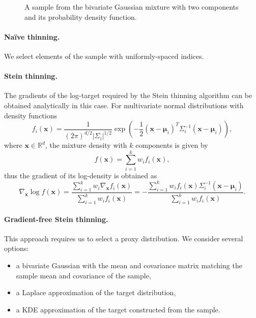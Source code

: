 \documentclass[11pt,a4paper]{report}
\begin{document}
\begin{figure}[h]
\centering
{}
\caption{A sample from the bivariate Gaussian mixture with two components and its probability density function.
\label{fig:gmm:sample}}
\end{figure}

\paragraph{Na\"ive thinning.} We select elements of the sample with uniformly-spaced indices.

\paragraph{Stein thinning.} The gradients of the log-target required by the Stein thinning algorithm can be obtained analytically in this case. For multivariate normal distributions with density functions
$$f_i(\mathbf{x}) = \frac{1}{(2\pi)^{d/2} |\Sigma_i|^{1/2}}\exp\left(-\frac{1}{2}(\mathbf{x} - \pmb{\mu}_i)^T \Sigma_i^{-1}(\mathbf{x}-\pmb{\mu}_i)\right),$$
where $\mathbf{x} \in \mathbb{R}^d$, the mixture density with $k$ components is given by
$$f(\mathbf{x}) = \sum_{i=1}^k w_i f_i(\mathbf{x}),$$
thus the gradient of its log-density is obtained as
$$\nabla_{\mathbf{x}} \log f(\mathbf{x}) = \frac{\sum_{i=1}^k w_i \nabla_{\mathbf{x}} f_i(\mathbf{x})}{\sum_{i=1}^k w_i f_i(\mathbf{x})} = -\frac{\sum_{i=1}^k w_i f_i(\mathbf{x}) \Sigma_i^{-1}(\mathbf{x} - \pmb{\mu}_i)}{\sum_{i=1}^k w_i f_i(\mathbf{x})}.$$

\paragraph{Gradient-free Stein thinning.} This approach requires us to select a proxy distribution. We consider several options:
\begin{itemize}
\item a bivariate Gaussian with the mean and covariance matrix matching the sample mean and covariance of the sample,
\item a Laplace approximation of the target distribution,
\item a KDE approximation of the target constructed from the sample.
\end{itemize}
\end{document}
